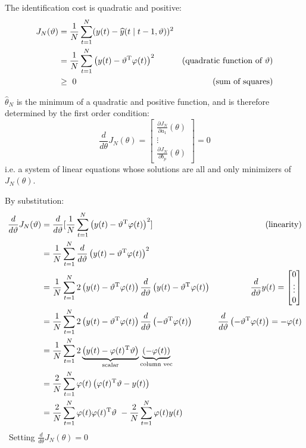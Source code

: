 The identification cost is quadratic and positive:		
\begin{align*}
J_{N}(\vartheta) & =\frac{1}{N}\sum _{t=1}^{N}(y(t) -\widehat{y}(t\mid t-1,\vartheta))^{2} & \\
 & =\frac{1}{N}\sum _{t=1}^{N}\left(y(t) -\vartheta ^{\mathrm{T}} \varphi (t)\right)^{2} & (\text{quadratic function of} \ \vartheta) \\
 & \geq \ 0 & \text{(sum of squares)}
\end{align*}


$ \hat{\theta }_{N}$ is the minimum of a quadratic and positive function, and is therefore determined by the first order condition:
\begin{equation*}
\frac{d}{d\theta } J_{N}(\theta) =\begin{bmatrix}
\frac{\partial J_{N}}{\partial a_{1}}(\theta)\\
\vdots \\
\frac{\partial J_{N}}{\partial b_{p}}(\theta)
\end{bmatrix} =0
\end{equation*}
i.e. a system of linear equations whose solutions are all and only minimizers of $ J_{N}(\theta)$.

By substitution:
\begin{align*}
\frac{d}{d\vartheta } J_{N}(\vartheta) & =\frac{d}{d\vartheta }[\frac{1}{N}\sum _{t=1}^{N}\left(y(t) -\vartheta ^{\mathrm{T}} \varphi (t)\right)^{2}] & \text{(linearity)}\\
 & =\frac{1}{N}\sum _{t=1}^{N}\frac{d}{d\vartheta }\left(y(t) -\vartheta ^{\mathrm{T}} \varphi (t)\right)^{2} & \\
 & =\frac{1}{N}\sum _{t=1}^{N} 2\left(y(t) -\vartheta ^{\mathrm{T}} \varphi (t)\right)\frac{d}{d\vartheta }\left(y(t) -\vartheta ^{\mathrm{T}} \varphi (t)\right) & \frac{d}{d\vartheta } y(t) =\begin{bmatrix}
0\\
\vdots \\
0
\end{bmatrix}\\
 & =\frac{1}{N}\sum _{t=1}^{N} 2\left(y(t) -\vartheta ^{\mathrm{T}} \varphi (t)\right)\frac{d}{d\vartheta }\left(-\vartheta ^{\mathrm{T}} \varphi (t)\right) & \frac{d}{d\vartheta }\left(-\vartheta ^{\mathrm{T}} \varphi (t)\right) =-\varphi (t)\\
 & =\frac{1}{N}\sum _{t=1}^{N} 2\underbrace{\left(y(t) -\varphi (t)^{\mathrm{T}} \vartheta \right)}_{\text{scalar}}\underbrace{(-\varphi (t))}_{\text{column vec}} & \\
 & =\frac{2}{N}\sum _{t=1}^{N} \varphi (t)\left(\varphi (t)^{\mathrm{T}} \vartheta -y(t)\right) & \\
 & =\frac{2}{N}\sum _{t=1}^{N} \varphi (t) \varphi (t)^{\mathrm{T}} \vartheta \ -\frac{2}{N}\sum _{t=1}^{N} \varphi (t) y(t) & 
\end{align*} \ 
Setting $ \frac{d}{d\theta } J_{N}(\theta) =0$	


